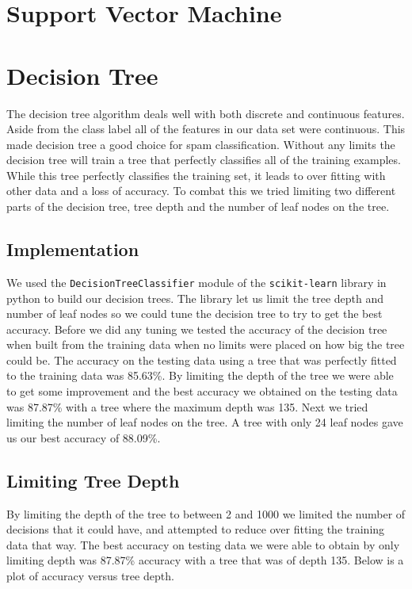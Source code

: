 \documentclass[10pt,letterpaper,onecolumn,draftclsnofoot]{IEEEtran}
\begin{document}
\section{Support Vector Machine}
\section{Decision Tree}
The decision tree algorithm deals well with both discrete and continuous features. Aside from the class label all of the features in our data set were continuous. This made decision tree a good choice for spam classification. Without any limits the decision tree will train a tree that perfectly classifies all of the training examples. While this tree perfectly classifies the training set, it leads to over fitting with other data and a loss of accuracy. To combat this we tried limiting two different parts of the decision tree, tree depth and the number of leaf nodes on the tree.

\subsection{Implementation}
We used the \texttt{DecisionTreeClassifier} module of the \texttt{scikit-learn} library in python to build our decision trees. The library let us limit the tree depth and number of leaf nodes so we could tune the decision tree to try to get the best accuracy. Before we did any tuning we tested the accuracy of the decision tree when built from the training data when no limits were placed on how big the tree could be. The accuracy on the testing data using a tree that was perfectly fitted to the training data was 85.63\%. By limiting the depth of the tree we were able to get some improvement and the best accuracy we obtained on the testing data was 87.87\% with a tree where the maximum depth was 135. Next we tried limiting the number of leaf nodes on the tree. A tree with only 24 leaf nodes gave us our best accuracy of 88.09\%.
 
\subsection{Limiting Tree Depth}
By limiting the depth of the tree to between 2 and 1000 we limited the number of decisions that it could have, and attempted to reduce over fitting the training data that way. The best accuracy on testing data we were able to obtain by only limiting depth was 87.87\% accuracy with a tree that was of depth 135. Below is a plot of accuracy versus tree depth.
\end{document}

